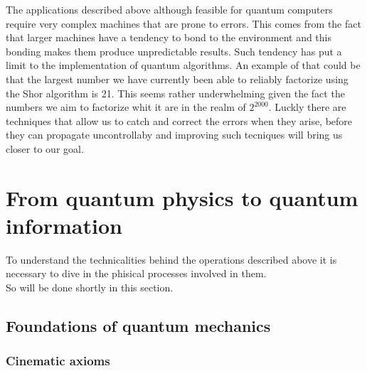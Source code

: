 \documentclass{article}
\begin{document}
The applications described above although feasible for quantum computers require
very complex machines that are prone to errors.
This comes from the fact that larger machines have a tendency to bond to the
environment and this bonding makes them produce unpredictable results.
Such tendency has put a limit to the implementation of quantum algorithms.
An example of that could be that the largest number we have currently been
able to reliably factorize using the Shor algorithm is 21.
This seems rather underwhelming given the fact the numbers we aim to factorize
whit it are in the realm of $2^{2000}$.
Luckly there are techniques that allow us to catch and correct the errors
when they arise, before they can propagate uncontrollaby and improving
such tecniques will bring us closer to our goal.


\section{From quantum physics to quantum information}

To understand the technicalities behind the operations described above it is
necessary to dive in the phisical processes involved in them.\\
So will be done shortly in this section.

\subsection{Foundations of quantum mechanics}

\subsubsection{Cinematic axioms}
\end{document}
